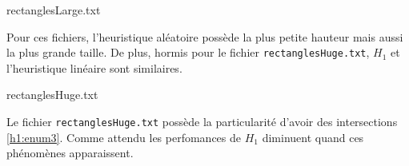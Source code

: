 \begin{table}
\caption{rectanglesLarge.txt}\label{tab:rect1}

\end{table}

Pour ces fichiers, l'heuristique aléatoire possède
la plus petite hauteur mais aussi la plus grande taille.
De plus, hormis pour le fichier \texttt{rectanglesHuge.txt}, $H_1$
et l'heuristique linéaire sont similaires.

\begin{table}
\caption{rectanglesHuge.txt}\label{tab:rect2}

\end{table}

Le fichier \texttt{rectanglesHuge.txt} possède la particularité d'avoir des
intersections \ref{h1:enum3}. Comme attendu les perfomances de $H_1$
diminuent quand ces phénomènes apparaissent.

